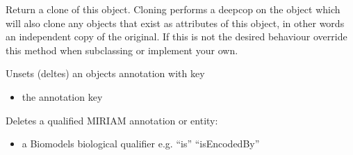 \documentclass[letterpaper,10pt,english]{sphinxmanual}
\begin{document}
\begin{fulllineitems}
\begin{fulllineitems}
\begin{itemize}
\end{itemize}

\end{fulllineitems}


\begin{fulllineitems}
\label{\detokenize{modules_doc:cbmpy.CBModel.Fbase.clone}}
\pysigstartsignatures
{}
\pysigstopsignatures
\sphinxAtStartPar
Return a clone of this object. Cloning performs a deepcop on the object which will also clone
any objects that exist as attributes of this object, in other words an independent copy of the
original. If this is not the desired behaviour override this method when subclassing or implement
your own.

\end{fulllineitems}


\begin{fulllineitems}
\label{\detokenize{modules_doc:cbmpy.CBModel.Fbase.deleteAnnotation}}
\pysigstartsignatures
{}
\pysigstopsignatures
\sphinxAtStartPar
Unsets (deltes) an objects annotation with key
\begin{itemize}
\item {} 
\sphinxAtStartPar
{} the annotation key

\end{itemize}

\end{fulllineitems}


\begin{fulllineitems}
\label{\detokenize{modules_doc:cbmpy.CBModel.Fbase.deleteMIRIAMannotation}}
\pysigstartsignatures
{}
\pysigstopsignatures
\sphinxAtStartPar
Deletes a qualified MIRIAM annotation or entity:
\begin{itemize}
\item {} 
\sphinxAtStartPar
{} a Biomodels biological qualifier e.g. “is” “isEncodedBy”


\end{itemize}
\end{fulllineitems}
\end{fulllineitems}
\end{document}
